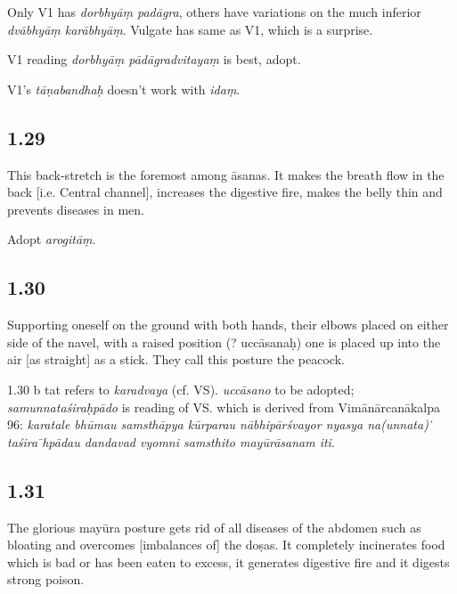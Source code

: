 \begin{ekdosis}
\begin{philcomm}[hp01_028]
Only V1 has \emph{dorbhyāṃ padāgra}, others have variations on the much inferior \emph{dvābhyāṃ karābhyāṃ}. Vulgate has same as V1, which is a surprise.

V1 reading \emph{dorbhyāṃ pādāgradvitayaṃ} is best, adopt.

V1’s \emph{tāṇabandhaḥ} doesn’t work with \emph{idaṃ}.
\end{philcomm}

\subsection*{1.29}
\begin{translation}[hp01_029]
This back-stretch is the foremost among āsanas. It makes the breath flow in the back [i.e. Central channel], increases the digestive fire, makes the belly thin and prevents diseases in men.
\end{translation}

\begin{philcomm}[hp01_029]
Adopt \emph{arogitāṃ}.
\end{philcomm}

\subsection*{1.30}
\begin{translation}[hp01_030]
Supporting oneself on the ground with both hands, their elbows placed on either side of the navel, with a raised position (? uccāsanaḥ) one is placed up into the air [as straight] as a stick. They call this posture the peacock.
\end{translation}

\begin{philcomm}[hp01_030]
1.30 b tat refers to \emph{karadvaya} (cf. VS).
\emph{uccāsano} to be adopted; \emph{samunnataśiraḥpādo} is reading of VS. which is derived from Vimānārcanākalpa 96: 
\emph{karatale bhūmau samsthāpya kūrparau nābhipārśvayor nyasya na(unnata)
̇ taśira ̄hpādau dandavad vyomni samsthito mayūrāsanam iti}.
\end{philcomm}

\subsection*{1.31}
\begin{translation}[hp01_031]
The glorious mayūra posture gets rid of all diseases of the abdomen such as bloating and overcomes [imbalances of] the doṣas. It completely incinerates food which is bad or has been eaten to excess, it generates digestive fire and it digests strong poison.
\end{translation}


\end{ekdosis}
